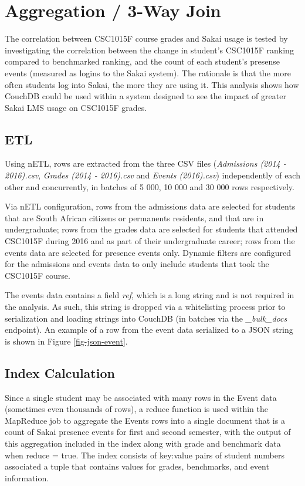 \section{Aggregation / 3-Way Join}
The correlation between CSC1015F course grades and Sakai usage is tested by investigating the correlation between the change in student's CSC1015F ranking compared to benchmarked ranking, and the count of each student's presense events (measured as logins to the Sakai system). The rationale is that the more often students log into Sakai, the more they are using it. This analysis shows how CouchDB could be used within a system designed to see the impact of greater Sakai LMS usage on CSC1015F grades.

\subsection{ETL}
Using nETL, rows are extracted from the three CSV files (\textit{Admissions (2014 - 2016).csv}, \textit{Grades (2014 - 2016).csv} and \textit{Events (2016).csv}) independently of each other and concurrently, in batches of 5 000, 10 000 and 30 000 rows respectively.

Via nETL configuration, rows from the admissions data are selected for students that are South African citizens or permanents residents, and that are in undergraduate; rows from the grades data are selected for students that attended CSC1015F during 2016 and as part of their undergraduate career; rows from the events data are selected for presence events only. Dynamic filters are configured for the admissions and events data to only include students that took the CSC1015F course.

The events data contains a field \textit{ref}, which is a long string and is not required in the analysis. As such, this string is dropped via a whitelisting process prior to serialization and loading strings into CouchDB (in batches via the \textit{\_bulk\_docs} endpoint). An example of a row from the event data serialized to a JSON string is shown in Figure \ref{fig-json-event}.



\subsection{Index Calculation}
Since a single student may be associated with many rows in the Event data (sometimes even thousands of rows), a reduce function is used within the MapReduce job to aggregate the Events rows into a single document that is a count of Sakai presence events for first and second semester, with the output of this aggregation included in the index along with grade and benchmark data when reduce = true. The index consists of key:value pairs of student numbers associated a tuple that contains values for grades, benchmarks, and event information.

